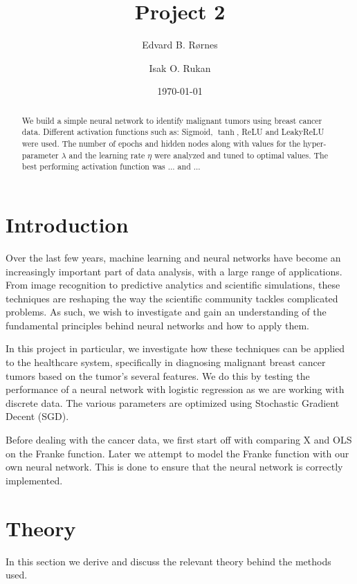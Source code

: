 \documentclass[%
reprint,
amsmath,amssymb,
aps,
]{revtex4-2}
\begin{document}
	
\title{Project 2}
\author{Edvard B. Rørnes}
\author{Isak O. Rukan}
\date{\today}

\begin{abstract}
	We build a simple neural network to identify malignant tumors using breast cancer data. Different activation functions such as: Sigmoid, $\tanh$, ReLU and LeakyReLU were used. The number of epochs and hidden nodes along with values for the hyper-parameter $\lambda$ and the learning rate $\eta$ were analyzed and tuned to optimal values. The best performing activation function was ... and ...
\end{abstract}

\maketitle

\section{Introduction}
Over the last few years, machine learning and neural networks have become an increasingly important part of data analysis, with a large range of applications. From image recognition to predictive analytics and scientific simulations, these techniques are reshaping the way the scientific community tackles complicated problems. As such, we wish to investigate and gain an understanding of the fundamental principles behind neural networks and how to apply them. 

In this project in particular, we investigate how these techniques can be applied to the healthcare system, specifically in diagnosing malignant breast cancer tumors based on the tumor's several features. We do this by testing the performance of a neural network with logistic regression as we are working with discrete data. The various parameters are optimized using Stochastic Gradient Decent (SGD).

Before dealing with the cancer data, we first start off with comparing X and OLS on the Franke function. Later we attempt to model the Franke function with our own neural network. This is done to ensure that the neural network is correctly implemented.

\section{Theory}
In this section we derive and discuss the relevant theory behind the methods used. 
\end{document}
